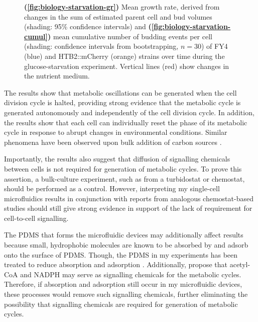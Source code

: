 \begin{figure}
  \caption[
    Mean growth rate, derived from changes in the sum of estimated parent cell and bud volumes and
    mean cumulative number of budding events per cell
    of FY4 and HTB2::mCherry strains over time during the glucose-starvation experiment.
  ]{
    \textbf{(\ref{fig:biology-starvation-gr})}
    Mean growth rate, derived from changes in the sum of estimated parent cell and bud volumes (shading: 95\% confidence intervals) and
    \textbf{(\ref{fig:biology-starvation-cumul})}
    mean cumulative number of budding events per cell (shading: confidence intervals from bootstrapping, $n=30$)
    of FY4 (blue) and HTB2::mCherry (orange) strains over time during the glucose-starvation experiment.
    Vertical lines (red) show changes in the nutrient medium.
  }
  \label{fig:biology-starvation-gr-budprob}
\end{figure}

The results show that metabolic oscillations can be generated when the cell division cycle is halted, providing strong evidence that the metabolic cycle is generated autonomously and independently of the cell division cycle.
In addition, the results show that each cell can individually reset the phase of its metabolic cycle in response to abrupt changes in environmental conditions.
Similar phenomena have been observed upon bulk addition of carbon sources \parencite{kuangMsn2RegulateExpression2017, krishnaMinimalPushPull2018}.

Importantly, the results also suggest that diffusion of signalling chemicals between cells is not required for generation of metabolic cycles.
To prove this assertion, a bulk-culture experiment, such as from a turbidostat or chemostat, should be performed as a control.
However, interpreting my single-cell microfluidics results in conjunction with reports from analogous chemostat-based studies \parencite{tuLogicYeastMetabolic2005} should still give strong evidence in support of the lack of requirement for cell-to-cell signalling.

The PDMS that forms the microfluidic devices may additionally affect results because small, hydrophobic molecules are known to be absorbed by \parencite{toepkePDMSAbsorptionSmall2006} and adsorb onto the surface of \parencite{liPDMSCompoundAdsorption2009} PDMS\@.
Though, the PDMS in my experiments has been treated to reduce absorption and adsorption \parencite{craneMicrofluidicSystemStudying2014}.
Additionally, \textcite{krishnaMinimalPushPull2018} propose that acetyl-CoA and NADPH may serve as signalling chemicals for the metabolic cycles.
Therefore, if absorption and adsorption still occur in my microfluidic devices, these processes would remove such signalling chemicals, further eliminating the possibility that signalling chemicals are required for generation of metabolic cycles.

